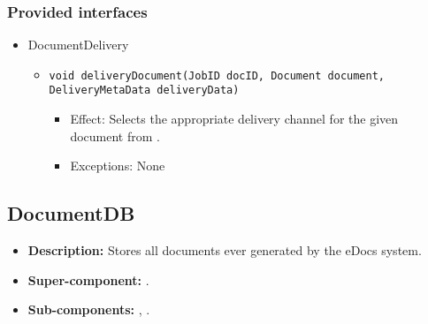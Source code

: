 \subsubsection*{Provided interfaces}
\begin{itemize}
    \item DocumentDelivery
    \begin{itemize}
        \item \texttt{void deliveryDocument(JobID docID, Document document, DeliveryMetaData deliveryData)}
        \begin{itemize}
            \item Effect: Selects the appropriate delivery channel for the given document from .
            \item Exceptions: None
        \end{itemize}
    \end{itemize}
\end{itemize}

\subsection{DocumentDB}
\begin{itemize}
    \item \textbf{Description:} Stores all documents ever generated by the eDocs system.
    \item \textbf{Super-component:} .
    \item \textbf{Sub-components:} , .
\end{itemize}


